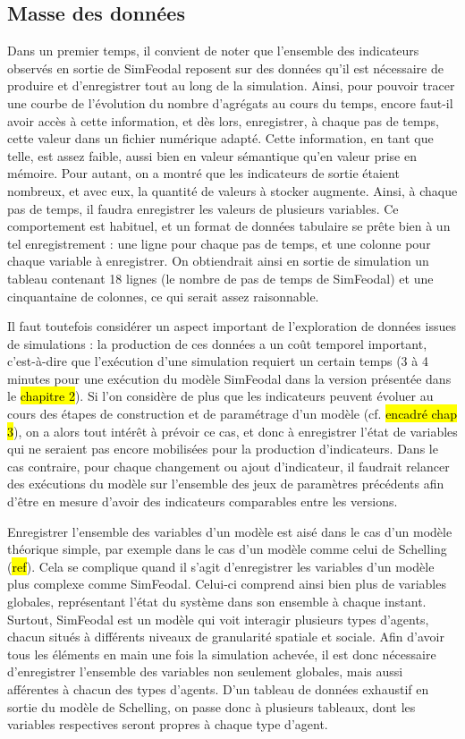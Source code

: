 	\subsection{Masse des données}
	Dans un premier temps, il convient de noter que l'ensemble des indicateurs observés en sortie de SimFeodal reposent sur des données qu'il est nécessaire de produire et d'enregistrer tout au long de la simulation.
	Ainsi, pour pouvoir tracer une courbe de l'évolution du nombre d'agrégats au cours du temps, encore faut-il avoir accès à cette information, et dès lors, enregistrer, à chaque pas de temps, cette valeur dans un fichier numérique adapté.
	Cette information, en tant que telle, est assez faible, aussi bien en valeur sémantique qu'en valeur prise en mémoire.
	Pour autant, on a montré que les indicateurs de sortie étaient nombreux, et avec eux, la quantité de valeurs à stocker augmente.
	Ainsi, à chaque pas de temps, il faudra enregistrer les valeurs de plusieurs variables.
	Ce comportement est habituel, et un format de données tabulaire se prête bien à un tel enregistrement : une ligne pour chaque pas de temps, et une colonne pour chaque variable à enregistrer.
	On obtiendrait ainsi en sortie de simulation un tableau contenant 18 lignes (le nombre de pas de temps de SimFeodal) et une cinquantaine de colonnes, ce qui serait assez raisonnable.

	Il faut toutefois considérer un aspect important de l'exploration de données issues de simulations : la production de ces données a un coût temporel important, c'est-à-dire que l’exécution d'une simulation requiert un certain temps (3 à 4 minutes pour une exécution du modèle SimFeodal dans la version présentée dans le \hl{chapitre 2}).
	Si l'on considère de plus que les indicateurs peuvent évoluer au cours des étapes de construction et de paramétrage d'un modèle (cf. \hl{encadré chap 3}), on a alors tout intérêt à prévoir ce cas, et donc à enregistrer l'état de variables qui ne seraient pas encore mobilisées pour la production d'indicateurs.
	Dans le cas contraire, pour chaque changement ou ajout d'indicateur, il faudrait relancer des exécutions du modèle sur l'ensemble des jeux de paramètres précédents afin d'être en mesure d'avoir des indicateurs comparables entre les versions.

	Enregistrer l'ensemble des variables d'un modèle est aisé dans le cas d'un modèle théorique simple, par exemple dans le cas d'un modèle comme celui de Schelling (\hl{ref}). Cela se complique quand il s'agit d'enregistrer les variables d'un modèle plus complexe comme SimFeodal.
	Celui-ci comprend ainsi bien plus de variables globales, représentant l'état du système dans son ensemble à chaque instant.
	Surtout, SimFeodal est un modèle qui voit interagir plusieurs types d'agents, chacun situés à différents niveaux de granularité spatiale et sociale.
	Afin d'avoir tous les éléments en main une fois la simulation achevée, il est donc nécessaire d'enregistrer l'ensemble des variables non seulement globales, mais aussi afférentes à chacun des types d'agents.
	D'un tableau de données exhaustif en sortie du modèle de Schelling, on passe donc à plusieurs tableaux, dont les variables respectives seront propres à chaque type d'agent.

